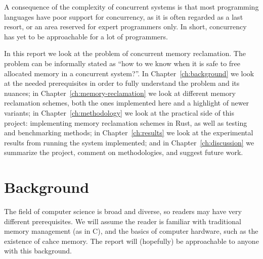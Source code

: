 \documentclass[b5paper]{report}
\begin{document}
A consequence of the complexity of concurrent systems is that most programming
languages have poor support for concurrency, as it is often regarded as a last
resort, or an area reserved for expert programmers only.
In short, concurrency has yet to be approachable for a lot of programmers.

In this report we look at the problem of concurrent memory reclamation. The
problem can be informally stated as ``how to we know when it is safe to free
allocated memory in a concurrent system?''. In Chapter~\ref{ch:background} we
look at the needed prerequisites in order to fully understand the problem and
its nuances; in Chapter~\ref{ch:memory-reclamation} we look at different memory
reclamation schemes, both the ones implemented here and a highlight of newer
variants; in Chapter~\ref{ch:methodology} we look at the practical side of this
project: implementing memory reclamation schemes in Rust, as well as testing and
benchmarking methods; in Chapter~\ref{ch:results} we look at the experimental
results from running the system implemented; and in Chapter~\ref{ch:discussion}
we summarize the project, comment on methodologies, and suggest future work.




\chapter{Background\label{ch:background}}


The field of computer science is broad and diverse, so readers may have very
different prerequisites.  We will assume the reader is familiar with traditional
memory management (as in C), and the basics of computer hardware, such as the
existence of cahce memory. The report will (hopefully) be approachable to anyone
with this background.
\end{document}
